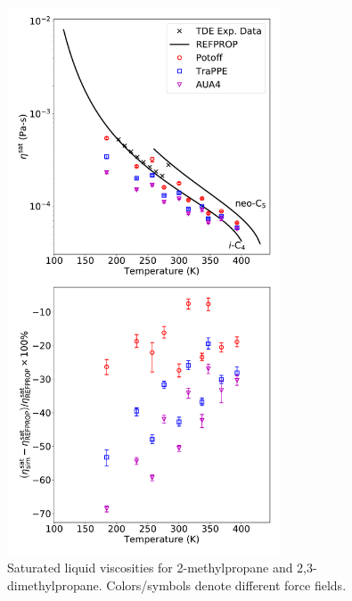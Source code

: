 \documentclass[preprint,review,12pt]{elsarticle}
\begin{document}
\begin{figure}[p!]
	\centering
	\includegraphics[width=3.2in]{compare_force_fields_IC4_neoC5.pdf}
	\caption{Saturated liquid viscosities for 2-methylpropane and 2,3-dimethylpropane. Colors/symbols denote different force fields.}
	\label{fig:Saturation_IC4_NEOC5}
\end{figure} 

\end{document}
